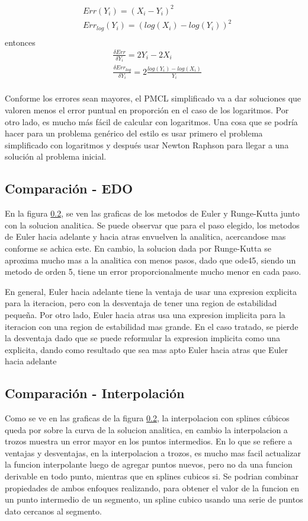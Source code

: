 \documentclass{endm}
\begin{document}
\begin{align*}
&Err(Y_i)= (X_i-Y_i)^2\\
&Err_{log}(Y_i)= (log(X_i)-log(Y_i))^2\\
\end{align*}
entonces
\begin{align*}
&\frac{\delta Err}{\delta Y_i} = 2Y_i - 2X_i\\
&\frac{\delta Err_{log}}{\delta Y_i} = 2\frac{log(Y_i)-log(X_i)}{Y_i}\\
\end{align*}

Conforme los errores sean mayores, el PMCL simplificado va a dar soluciones que valoren menos el error puntual en proporción en el caso de los logaritmos. Por otro lado, es mucho más fácil de calcular con logaritmos. Una cosa que se podría hacer para un problema genérico del estilo es usar primero el problema simplificado con logaritmos y después usar Newton Raphson para llegar a una solución al problema inicial.

\subsection{Comparación - EDO}
En la figura \ref{}, se ven las graficas de los metodos de Euler y Runge-Kutta junto con la solucion analitica. Se puede observar que para el paso elegido, los metodos de Euler hacia adelante y hacia atras envuelven la analitica, acercandose mas conforme se achica este. En cambio, la solucion dada por Runge-Kutta se aproxima mucho mas a la analitica con menos pasos, dado que ode45, siendo un metodo de orden 5, tiene un error proporcionalmente mucho menor en cada paso.

En general, Euler hacia adelante tiene la ventaja de usar una expresion explicita para la iteracion, pero con la desventaja de tener una region de estabilidad pequeña. Por otro lado, Euler hacia atras usa una expresion implicita para la iteracion con una region de estabilidad mas grande. En el caso tratado, se pierde la desventaja dado que se puede reformular la expresion implicita como una explicita, dando como resultado que sea mas apto Euler hacia atras que Euler hacia adelante

\subsection{Comparación - Interpolación}
Como se ve en las graficas de la figura \ref{}, la interpolacion con splines cúbicos queda por sobre la curva de la solucion analitica, en cambio la interpolacion a trozos muestra un error mayor en los puntos intermedios.
En lo que se refiere a ventajas y desventajas, en la interpolacion a trozos, es mucho mas facil actualizar la funcion interpolante luego de agregar puntos nuevos, pero no da una funcion derivable en todo punto, mientras que en splines cubicos si. Se podrian combinar propiedades de ambos enfoques realizando, para obtener el valor de la funcion en un punto intermedio de un segmento, un spline cubico usando una serie de puntos dato cercanos al segmento.

\clearpage
\printbibliography
\end{document}
